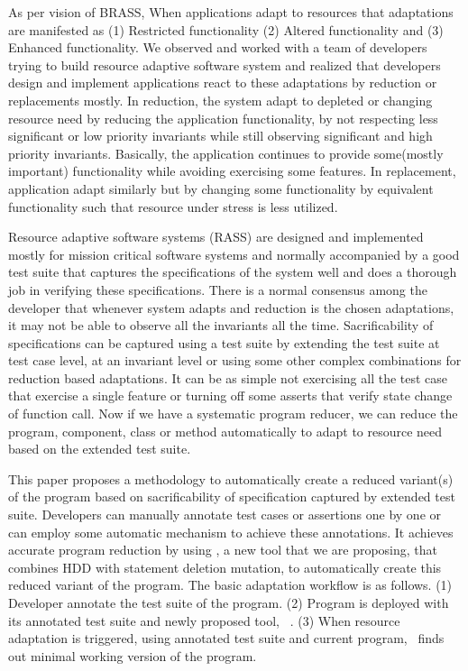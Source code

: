 As per vision of BRASS, When applications adapt to resources that adaptations are manifested as (1) Restricted functionality (2) Altered functionality and (3) Enhanced functionality. We observed and worked with a team of developers trying to build resource adaptive software system and realized that developers design and implement applications react to these adaptations by reduction or replacements mostly. In reduction, the system adapt to depleted or changing resource need by reducing the application functionality, by not respecting less significant or low priority invariants while still observing significant and high priority invariants. Basically, the application continues to provide some(mostly important) functionality while avoiding exercising some features. In replacement, application adapt similarly but by changing some functionality by equivalent functionality such that resource under stress is less utilized.  

Resource adaptive software systems (RASS) are designed and implemented mostly for mission critical software systems and normally accompanied by a good test suite that captures the specifications of the system well and does a thorough job in verifying these specifications. There is a normal consensus among the developer that whenever system adapts and reduction is the chosen adaptations, it may not be able to observe all the invariants all the time. Sacrificability of specifications can be captured using a test suite by extending the test suite at test case level, at an invariant level or using some other complex combinations for reduction based adaptations. It can be as simple not exercising all the test case that exercise a single feature or turning off some asserts that verify state change of function call.  Now if we have a systematic program reducer, we can reduce the program, component, class or method automatically to adapt to resource need based on the extended test suite. 

This paper proposes a methodology to automatically create a reduced variant(s) of the program based on sacrificability of specification captured by extended test suite.  Developers can manually annotate test cases or assertions one by one or can employ some automatic mechanism to achieve these annotations. It achieves accurate program reduction by using \mytool, a new tool that we are proposing,  that combines HDD with statement deletion mutation, to automatically create this reduced variant of the program. The basic adaptation workflow is as follows. (1) Developer annotate the test suite of the program. (2) Program is deployed with its annotated test suite and newly proposed tool, \mytool\ . (3) When resource adaptation is triggered, using annotated test suite and current program, \mytool\ finds out minimal working version of the program.

